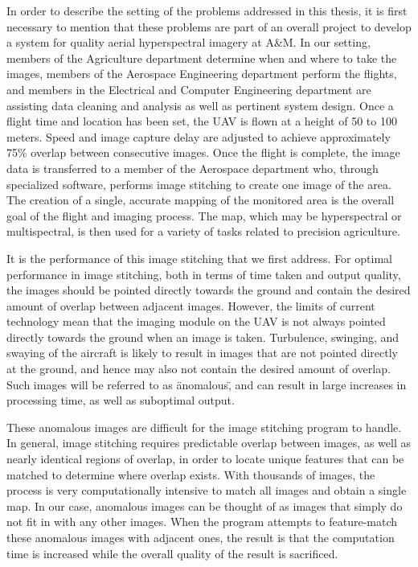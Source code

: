 In order to describe the setting of the problems addressed in this thesis, it is first necessary to mention that these problems are part of an overall project to develop a system for quality aerial hyperspectral imagery at A\&M.
In our setting, members of the Agriculture department determine when and where to take the images, members of the Aerospace Engineering department perform the flights, and members in the Electrical and Computer Engineering department are assisting data cleaning and analysis as well as pertinent system design.
Once a flight time and location has been set, the UAV is flown at a height of 50 to 100 meters.
Speed and image capture delay are adjusted to achieve approximately 75\% overlap between consecutive images.
Once the flight is complete, the image data is transferred to a member of the Aerospace department who, through specialized software, performs image stitching to create one image of the area.
The creation of a single, accurate mapping of the monitored area is the overall goal of the flight and imaging process.
The map, which may be hyperspectral or multispectral, is then used for a variety of tasks related to precision agriculture.

It is the performance of this image stitching that we first address.
For optimal performance in image stitching, both in terms of time taken and output quality, the images should be pointed directly towards the ground and contain the desired amount of overlap between adjacent images.
However, the limits of current technology mean that the imaging module on the UAV is not always pointed directly towards the ground when an image is taken.
Turbulence, swinging, and swaying of the aircraft is likely to result in images that are not pointed directly at the ground, and hence may also not contain the desired amount of overlap.
Such images will be referred to as \"anomalous\", and can result in large increases in processing time, as well as suboptimal output.

These anomalous images are difficult for the image stitching program to handle.
In general, image stitching requires predictable overlap between images, as well as nearly identical regions of overlap, in order to locate unique features that can be matched to determine where overlap exists.
With thousands of images, the process is very computationally intensive to match all images and obtain a single map.
In our case, anomalous images can be thought of as images that simply do not fit in with any other images.
When the program attempts to feature-match these anomalous images with adjacent ones, the result is that the computation time is increased while the overall quality of the result is sacrificed.

